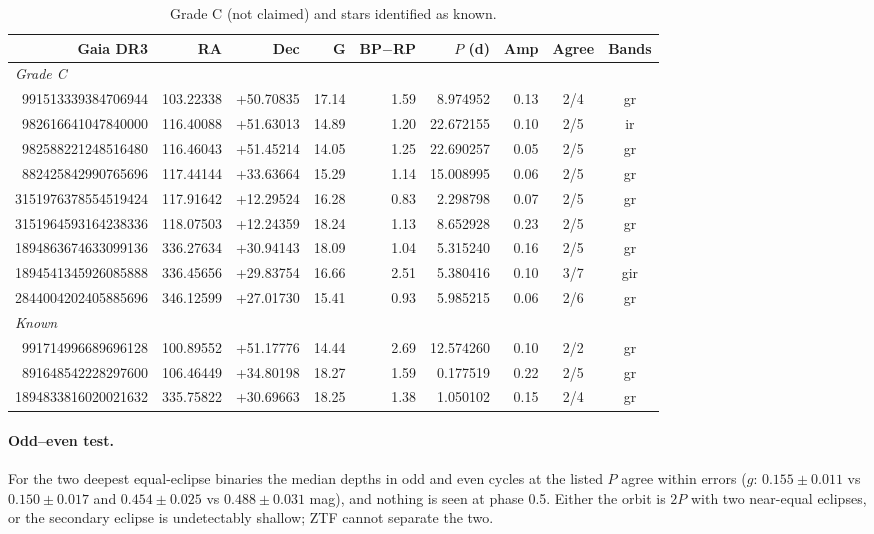 \documentclass[11pt]{article}
\begin{document}
{\small\setlength{\tabcolsep}{3.5pt}
\begin{longtable}{rrrrrrrcc}
\caption{Grade C (not claimed) and stars identified as known.}\\
\toprule Gaia DR3 & RA & Dec & G & BP$-$RP & $P$ (d) & Amp & Agree & Bands\\\midrule
\multicolumn{9}{l}{\emph{Grade C}}\\
991513339384706944 & 103.22338 & +50.70835 & 17.14 & 1.59 & 8.974952 & 0.13 & 2/4 & gr \\
982616641047840000 & 116.40088 & +51.63013 & 14.89 & 1.20 & 22.672155 & 0.10 & 2/5 & ir \\
982588221248516480 & 116.46043 & +51.45214 & 14.05 & 1.25 & 22.690257 & 0.05 & 2/5 & gr \\
882425842990765696 & 117.44144 & +33.63664 & 15.29 & 1.14 & 15.008995 & 0.06 & 2/5 & gr \\
3151976378554519424 & 117.91642 & +12.29524 & 16.28 & 0.83 & 2.298798 & 0.07 & 2/5 & gr \\
3151964593164238336 & 118.07503 & +12.24359 & 18.24 & 1.13 & 8.652928 & 0.23 & 2/5 & gr \\
1894863674633099136 & 336.27634 & +30.94143 & 18.09 & 1.04 & 5.315240 & 0.16 & 2/5 & gr \\
1894541345926085888 & 336.45656 & +29.83754 & 16.66 & 2.51 & 5.380416 & 0.10 & 3/7 & gir \\
2844004202405885696 & 346.12599 & +27.01730 & 15.41 & 0.93 & 5.985215 & 0.06 & 2/6 & gr \\
\multicolumn{9}{l}{\emph{Known}}\\
991714996689696128 & 100.89552 & +51.17776 & 14.44 & 2.69 & 12.574260 & 0.10 & 2/2 & gr \\
891648542228297600 & 106.46449 & +34.80198 & 18.27 & 1.59 & 0.177519 & 0.22 & 2/5 & gr \\
1894833816020021632 & 335.75822 & +30.69663 & 18.25 & 1.38 & 1.050102 & 0.15 & 2/4 & gr \\
\bottomrule\end{longtable}}

\paragraph{Odd--even test.} For the two deepest equal-eclipse binaries the median depths in odd and even cycles at the listed $P$ agree within errors ($g$: $0.155\pm0.011$ vs $0.150\pm0.017$ and $0.454\pm0.025$ vs $0.488\pm0.031$ mag), and nothing is seen at phase 0.5. Either the orbit is $2P$ with two near-equal eclipses, or the secondary eclipse is undetectably shallow; ZTF cannot separate the two.
\end{document}
